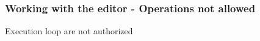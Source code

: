 \begin{frame}
    \frametitle{Working with the editor - Operations not allowed}
    Execution loop are not authorized
    \vspace*{1em}
    \begin{columns}
        \begin{column}{0.7\textwidth}
        \end{column}
        \begin{column}{0.3\textwidth}
        \end{column}
    \end{columns}
\end{frame}


